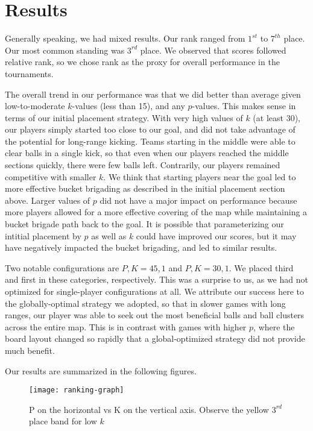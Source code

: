 \documentclass[
10pt, %
letterpaper, %
oneside, %
headinclude,footinclude, %
english
]{article}
\begin{document}
\section{Results}
Generally speaking, we had mixed results. Our rank ranged from $1^{st}$ to $7^{th}$ place. Our most common standing was $3^{rd}$ place. We observed that scores followed relative rank, so we chose rank as the proxy for overall performance in the tournaments.

The overall trend in our performance was that we did better than average given low-to-moderate $k$-values (less than 15), and any $p$-values. This makes sense in terms of our initial placement strategy. With very high values of $k$ (at least 30), our players simply started too close to our goal, and did not take advantage of the potential for long-range kicking. Teams starting in the middle were able to clear balls in a single kick, so that even when our players reached the middle sections quickly, there were few balls left. Contrarily, our players remained competitive with smaller $k$. We think that starting players near the goal led to more effective bucket brigading as described in the initial placement section above. Larger values of $p$ did not have a major impact on performance because more players allowed for a more effective covering of the map while maintaining a bucket brigade path back to the goal. It is possible that parameterizing our intitial placement by $p$ as well as $k$ could have improved our scores, but it may have negatively impacted the bucket brigading, and led to similar results.

Two notable configurations are $P,K=45,1$ and $P,K=30,1$. We placed third and first in these categories, respectively. This was a surprise to us, as we had not optimized for single-player configurations at all. We attribute our success here to the globally-optimal strategy we adopted, so that in slower games with long ranges, our player was able to seek out the most beneficial balls and ball clusters across the entire map. This is in contrast with games with higher $p$, where the board layout changed so rapidly that a global-optimized strategy did not provide much benefit. 

Our results are summarized in the following figures. 

\begin{figure}[h]
\centering 
\texttt{[image: ranking-graph]} 
\caption[P on the horizontal vs K on the vertical]{P on the horizontal vs K on the vertical axis. Observe the yellow $3^{rd}$ place band for low $k$}
\label{fig:gallery2} 
\end{figure}
\end{document}

